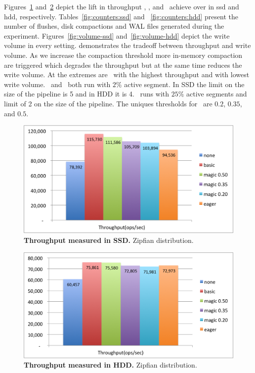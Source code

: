 {Figures~\ref{fig:throughput-ssd} and~\ref{fig:throughput-hdd} depict the lift in throughput \basic, \magic, and \eager\ achieve over \none in ssd and hdd, respectively.
Tables~\ref{fig:counters:ssd} and ~\ref{fig:counters:hdd} present the number of flushes, disk compactions and WAL files generated during the experiment.
Figures~\ref{fig:volume-ssd} and~\ref{fig:volume-hdd} depict the write volume in every setting. 
\magic demonstrates the tradeoff between throughput and write volume. As we increase the compaction threshold more in-memory compaction are triggered which degrades the throughput but at the same time reduces the write volume.
At the extremes are \basic\ with the highest throughput and \eager with lowest write volume.
\basic\ and \magic\ both run with $2\%$ active segment. In SSD the limit on the size of the pipeline is 5 and in HDD it is 4.
\eager\ runs with $25\%$ active segments and limit of 2 on the size of the pipeline.
The uniques thresholds for \magic\ are $0.2$, $0.35$, and $0.5$.



\begin{figure}[htb]
\includegraphics[width=\figw]{Figs/throughput-ssd.png}
\caption{{\bf  Throughput measured in SSD.} Zipfian distribution.
}
\label{fig:throughput-ssd}
\end{figure}

\begin{figure}[htb]
\includegraphics[width=\figw]{Figs/throughput-hdd.png}
\caption{{\bf  Throughput measured in HDD.} Zipfian distribution. 
}
\label{fig:throughput-hdd}
\end{figure}


}
